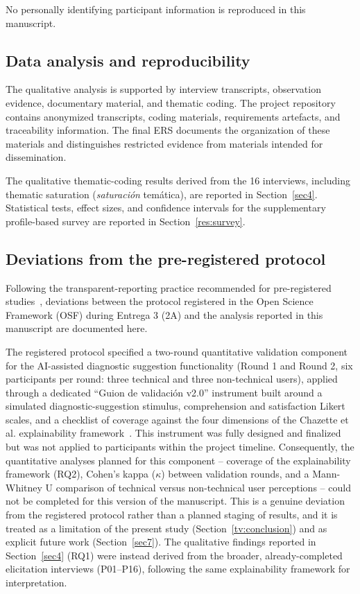 \documentclass[pdflatex,sn-mathphys-num,Numbered]{sn-jnl}
\begin{document}
No personally identifying participant information is reproduced in this manuscript.

\subsection{Data analysis and reproducibility}\label{subsec8}

The qualitative analysis is supported by interview transcripts, observation evidence, documentary material, and thematic coding. The project repository contains anonymized transcripts, coding materials, requirements artefacts, and traceability information. The final ERS documents the organization of these materials and distinguishes restricted evidence from materials intended for dissemination.

The qualitative thematic-coding results derived from the 16 interviews, including thematic saturation (\emph{saturación} temática), are reported in Section~\ref{sec4}. Statistical tests, effect sizes, and confidence intervals for the supplementary profile-based survey are reported in Section~\ref{res:survey}.

\subsection{Deviations from the pre-registered protocol}\label{subsec8b}

Following the transparent-reporting practice recommended for pre-registered studies~\cite{nosek2018}, deviations between the protocol registered in the Open Science Framework (OSF) during Entrega 3 (2A) and the analysis reported in this manuscript are documented here.

The registered protocol specified a two-round quantitative validation component for the AI-assisted diagnostic suggestion functionality (Round 1 and Round 2, six participants per round: three technical and three non-technical users), applied through a dedicated ``Guion de validación v2.0'' instrument built around a simulated diagnostic-suggestion stimulus, comprehension and satisfaction Likert scales, and a checklist of coverage against the four dimensions of the Chazette et al. explainability framework~\cite{chazette2020,chazette2021,chazette2022}. This instrument was fully designed and finalized but was not applied to participants within the project timeline. Consequently, the quantitative analyses planned for this component -- coverage of the explainability framework (RQ2), Cohen's kappa ($\kappa$) between validation rounds, and a Mann-Whitney U comparison of technical versus non-technical user perceptions -- could not be completed for this version of the manuscript. This is a genuine deviation from the registered protocol rather than a planned staging of results, and it is treated as a limitation of the present study (Section~\ref{tv:conclusion}) and as explicit future work (Section~\ref{sec7}). The qualitative findings reported in Section~\ref{sec4} (RQ1) were instead derived from the broader, already-completed elicitation interviews (P01--P16), following the same explainability framework for interpretation.
\end{document}
